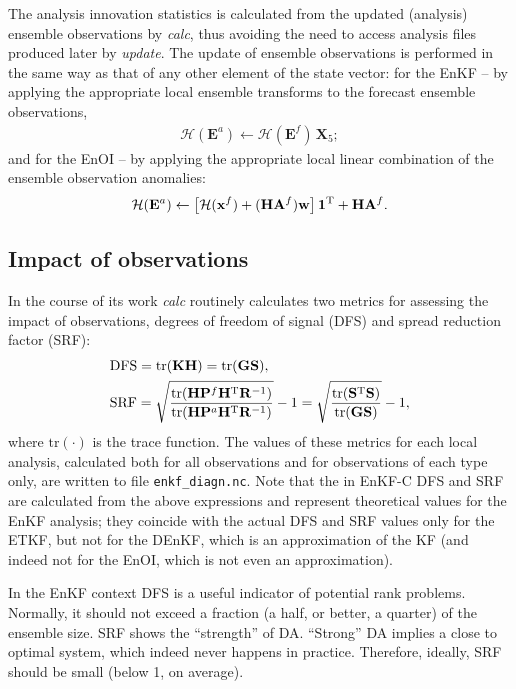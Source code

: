 \documentclass[11pt]{report}
\newcommand{\mb} {\mathbf}
\newcommand{\T}{^{\tiny \mathrm T}}
\begin{document}
The analysis innovation statistics is calculated from the updated (analysis) ensemble observations by \emph{calc}, thus avoiding the need to access analysis files produced later by \emph{update}.
The update of ensemble observations is performed in the same way as that of any other element of the state vector:
for the EnKF -- by applying the appropriate local ensemble transforms to the forecast ensemble observations,
\begin{align*}
  \mathcal H (\mb E^a) \leftarrow \mathcal H (\mb E^f) \, \mb X_5;
\end{align*}
and for the EnOI -- by applying the appropriate local linear combination of the ensemble observation anomalies:
\begin{align*}
  \mathcal H (\mb E^a) \leftarrow \left[ \mathcal H (\mb x^f) + (\mb H \mb A^f) \mb w\right] \mb 1\T + \mb H \mb A^f.
\end{align*}

\subsection{Impact of observations}

In the course of its work \emph{calc} routinely calculates two metrics for assessing the impact of observations, degrees of freedom of signal (DFS) and spread reduction factor (SRF):
\begin{align*}
  & \mathrm{DFS} = \mathrm{tr}(\mb K \mb H) = \mathrm{tr}(\mb G \mb S), \\
  & \mathrm{SRF} = \sqrt{\frac{\mathrm{tr}(\mb H \mb P^f \mb H\T \mb R^{-1})}{\mathrm{tr}(\mb H \mb P^a \mb H\T \mb R^{-1})}} - 1 = \sqrt{\frac{\mathrm{tr}(\mb S\T \mb S)}{\mathrm{tr}(\mb G \mb S)}} - 1,
\end{align*}
where $\mathrm{tr}(\cdot)$ is the trace function.
The values of these metrics for each local analysis, calculated both for all observations and for observations of each type only, are written to file \verb|enkf_diagn.nc|.
Note that the in EnKF-C DFS and SRF are calculated from the above expressions and represent theoretical values for the EnKF analysis; they coincide with the actual DFS and SRF values only for the ETKF, but not for the DEnKF, which is an approximation of the KF (and indeed not for the EnOI, which is not even an approximation).

In the EnKF context DFS is a useful indicator of potential rank problems.
Normally, it should not exceed a fraction (a half, or better, a quarter) of the ensemble size.
SRF shows the ``strength'' of DA.
``Strong'' DA implies a close to optimal system, which indeed never happens in practice.
Therefore, ideally, SRF should be small (below 1, on average).
\end{document}
